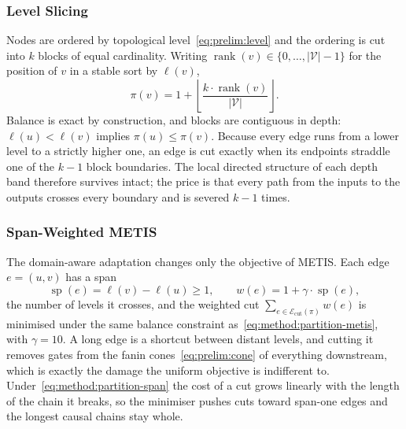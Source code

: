 \subsubsection{Level Slicing}
\label{sec:method:partition:levelslice}
Nodes are ordered by topological level~\eqref{eq:prelim:level} and the ordering is cut
into $k$ blocks of equal cardinality. Writing
$\operatorname{rank}(v) \in \{0, \dots, |\mathcal{V}| - 1\}$ for the position of $v$ in a
stable sort by $\ell(v)$,
\begin{equation}
    \pi(v) = 1 + \left\lfloor
    \frac{k \cdot \operatorname{rank}(v)}{|\mathcal{V}|} \right\rfloor.
    \label{eq:method:partition-slice}
\end{equation}
Balance is exact by construction, and blocks are contiguous in depth:
$\ell(u) < \ell(v)$ implies $\pi(u) \leq \pi(v)$. Because every edge runs from a lower
level to a strictly higher one, an edge is cut exactly when its endpoints straddle one of
the $k - 1$ block boundaries. The local directed structure of each depth band therefore
survives intact; the price is that every path from the inputs to the outputs crosses every
boundary and is severed $k - 1$ times.

\subsubsection{Span-Weighted METIS}
\label{sec:method:partition:spanmetis}
The domain-aware adaptation changes only the objective of METIS\@. Each edge
$e = (u, v)$ has a span
\begin{equation}
    \operatorname{sp}(e) = \ell(v) - \ell(u) \geq 1,
    \qquad
    w(e) = 1 + \gamma \cdot \operatorname{sp}(e),
    \label{eq:method:partition-span}
\end{equation}
the number of levels it crosses, and the weighted cut
$\sum_{e \in \mathcal{E}_{\mathrm{cut}}(\pi)} w(e)$ is minimised under the same balance
constraint as~\eqref{eq:method:partition-metis}, with $\gamma = 10$. A long edge is a
shortcut between distant levels, and cutting it removes gates from the fanin
cones~\eqref{eq:prelim:cone} of everything downstream, which is exactly the damage the
uniform objective is indifferent to. Under~\eqref{eq:method:partition-span} the cost of a
cut grows linearly with the length of the chain it breaks, so the minimiser pushes cuts
toward span-one edges and the longest causal chains stay whole.
